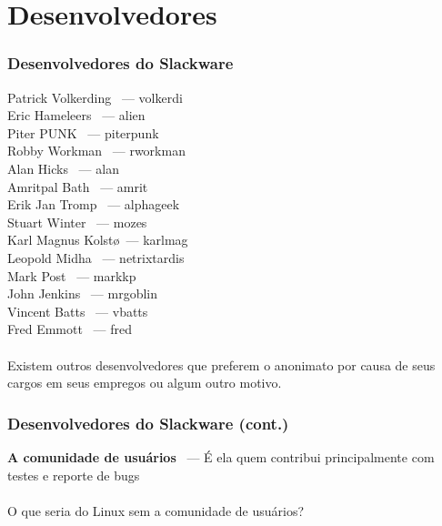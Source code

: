 \documentclass{beamer}
\begin{document}
\section{Desenvolvedores}
\begin{frame}
	\frametitle{Desenvolvedores do Slackware}
	\footnotesize{
	Patrick Volkerding ~--- volkerdi\@@ \\
	Eric Hameleers ~--- alien\@@ \\
	Piter PUNK ~--- piterpunk\@@ \\
	Robby Workman ~--- rworkman\@@ \\
	Alan Hicks ~--- alan\@@ \\
	Amritpal Bath ~--- amrit\@@ \\
	Erik Jan Tromp ~--- alphageek\@@ \\
	Stuart Winter ~--- mozes\@@ \\
	Karl Magnus Kolst\o ~--- karlmag\@@ \\
	Leopold Midha ~--- netrixtardis\@@ \\
	Mark Post ~--- markkp\@@ \\
	John Jenkins ~--- mrgoblin\@@ \\
	Vincent Batts ~--- vbatts\@@ \\
	Fred Emmott ~--- fred\@@ \\
	}
	~\\
	Existem outros desenvolvedores que preferem o anonimato por causa de seus
	cargos em seus empregos ou algum outro motivo.	
\end{frame}

\begin{frame}
	\frametitle{Desenvolvedores do Slackware (cont.)}
	\textbf{A comunidade de usuários} ~--- É ela quem contribui principalmente
	com testes e reporte de bugs
	~\\
	~\\
	O que seria do Linux sem a comunidade de usuários?
\end{frame}
\end{document}

